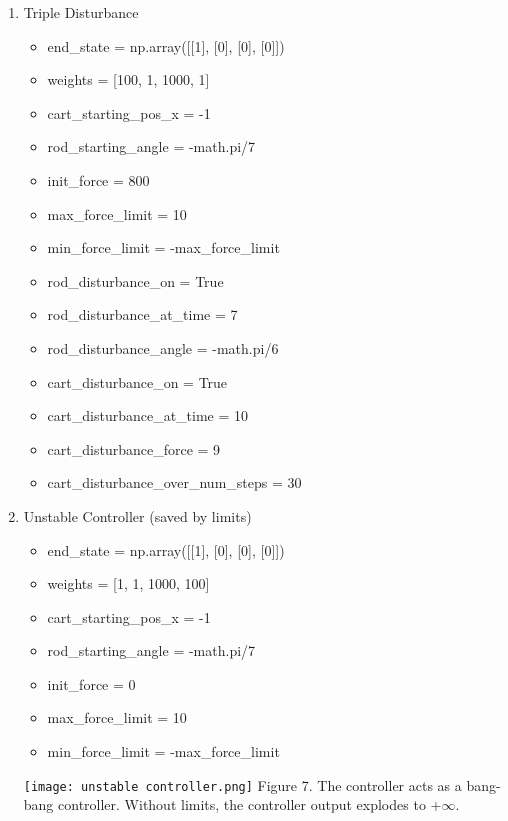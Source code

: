 \documentclass{article}
\begin{document}
\begin{enumerate}
    
    \item Triple Disturbance 
         \begin{itemize}
            \item end\_state = np.array([[1], [0], [0], [0]])
            \item weights = [100, 1, 1000, 1]
            \item cart\_starting\_pos\_x = -1
            \item rod\_starting\_angle = -math.pi/7
            \item init\_force = 800
            \item max\_force\_limit = 10
            \item min\_force\_limit = -max\_force\_limit
            \item rod\_disturbance\_on = True
            \item rod\_disturbance\_at\_time = 7
            \item rod\_disturbance\_angle = -math.pi/6
            \item cart\_disturbance\_on = True
            \item cart\_disturbance\_at\_time = 10
            \item cart\_disturbance\_force = 9
            \item cart\_disturbance\_over\_num\_steps = 30
        \end{itemize}
    
    \item Unstable Controller (saved by limits)
        \begin{itemize}
            \item end\_state = np.array([[1], [0], [0], [0]])
            \item weights = [1, 1, 1000, 100]
            \item cart\_starting\_pos\_x = -1
            \item rod\_starting\_angle = -math.pi/7
            \item init\_force = 0
            \item max\_force\_limit = 10
            \item min\_force\_limit = -max\_force\_limit
        \end{itemize}
        \begin{center}
            \texttt{[image: unstable controller.png]}
            Figure 7. The controller acts as a bang-bang controller. Without limits, the controller output explodes to +$\infty$.
        \end{center}
        

\end{enumerate}
\end{document}
